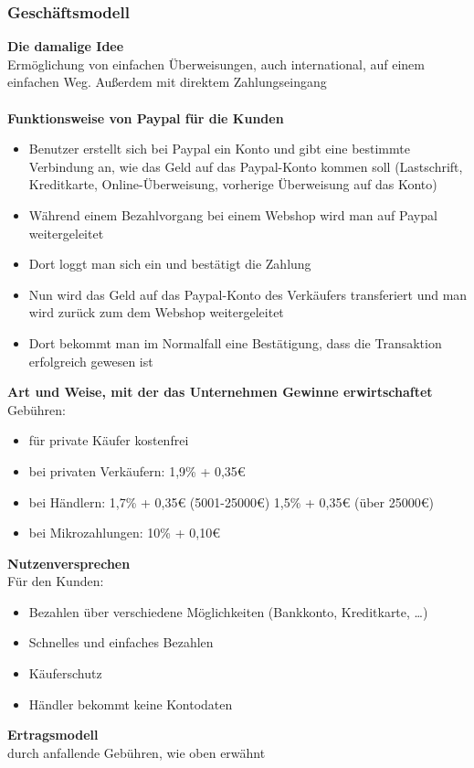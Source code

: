 \subsubsection{Geschäftsmodell}
\textbf{Die damalige Idee}\\
Ermöglichung von einfachen Überweisungen, auch international, auf einem einfachen Weg. Außerdem mit direktem Zahlungseingang\\
\\
\textbf{Funktionsweise von Paypal für die Kunden}
\begin{itemize}
\item Benutzer erstellt sich bei Paypal ein Konto und gibt eine bestimmte Verbindung an, wie das Geld auf das Paypal-Konto kommen soll (Lastschrift, Kreditkarte, Online-Überweisung, vorherige Überweisung auf das Konto)
\item Während einem Bezahlvorgang bei einem Webshop wird man auf Paypal weitergeleitet
\item Dort loggt man sich ein und bestätigt die Zahlung
\item Nun wird das Geld auf das Paypal-Konto des Verkäufers transferiert und man wird zurück zum dem Webshop weitergeleitet
\item Dort bekommt man im Normalfall eine Bestätigung, dass die Transaktion erfolgreich gewesen ist
\end{itemize}

\textbf{Art und Weise, mit der das Unternehmen Gewinne erwirtschaftet}\\
Gebühren:
\begin{itemize}
\item für private Käufer kostenfrei
\item bei privaten Verkäufern: 1,9\% + 0,35\euro{}
\item bei Händlern: 1,7\% + 0,35\euro{} (5001-25000\euro{}) 1,5\% + 0,35\euro{} (über 25000\euro{})
\item bei Mikrozahlungen: 10\% + 0,10\euro{}
\end{itemize}
\textbf{Nutzenversprechen}\\
Für den Kunden:
\begin{itemize}
\item Bezahlen über verschiedene Möglichkeiten (Bankkonto, Kreditkarte, …)
\item Schnelles und einfaches Bezahlen
\item Käuferschutz
\item Händler bekommt keine Kontodaten
\end{itemize}
\textbf{Ertragsmodell}\\
durch anfallende Gebühren, wie oben erwähnt
